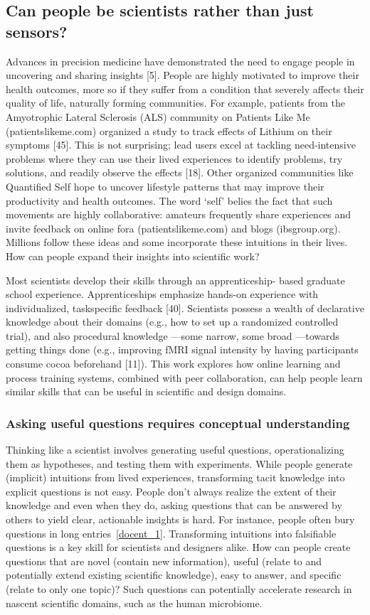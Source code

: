 \subsection{Can people be scientists rather than just sensors?}
Advances in precision medicine have demonstrated the need
to engage people in uncovering and sharing insights [5]. People
are highly motivated to improve their health outcomes,
more so if they suffer from a condition that severely affects
their quality of life, naturally forming communities. For example,
patients from the Amyotrophic Lateral Sclerosis
(ALS) community on Patients Like Me (patientslikeme.com)
organized a study to track effects of Lithium on their symptoms
[45]. This is not surprising; lead users excel at tackling
need-intensive problems where they can use their lived
experiences to identify problems, try solutions, and readily
observe the effects [18]. Other organized communities like
Quantified Self hope to uncover lifestyle patterns that may
improve their productivity and health outcomes. The word
‘self’ belies the fact that such movements are highly collaborative:
amateurs frequently share experiences and invite
feedback on online fora (patientslikeme.com) and blogs
(ibsgroup.org). Millions follow these ideas and some incorporate
these intuitions in their lives. How can people expand
their insights into scientific work?

Most scientists develop their skills through an apprenticeship-
based graduate school experience. Apprenticeships emphasize
hands-on experience with individualized, taskspecific
feedback [40]. Scientists possess a wealth of declarative
knowledge about their domains (e.g., how to set up a
randomized controlled trial), and also procedural knowledge
—some narrow, some broad —towards getting things done
(e.g., improving fMRI signal intensity by having participants
consume cocoa beforehand [11]). This work explores how
online learning and process training systems, combined with
peer collaboration, can help people learn similar skills that
can be useful in scientific and design domains.

\subsubsection{Asking useful questions requires conceptual understanding}
Thinking like a scientist involves generating useful questions,
operationalizing them as hypotheses, and testing them
with experiments. While people generate (implicit) intuitions
from lived experiences, transforming tacit knowledge into
explicit questions is not easy. People don’t always realize the
extent of their knowledge and even when they do, asking questions 
that can be answered by others to yield clear, actionable
insights is hard. For instance, people often bury
questions in long entries~\ref{docent_1}. Transforming intuitions
into falsifiable questions is a key skill for scientists and designers
alike. How can people create questions that are novel
(contain new information), useful (relate to and potentially
extend existing scientific knowledge), easy to answer, and
specific (relate to only one topic)? Such questions can
potentially accelerate research in nascent scientific domains,
such as the human microbiome.

